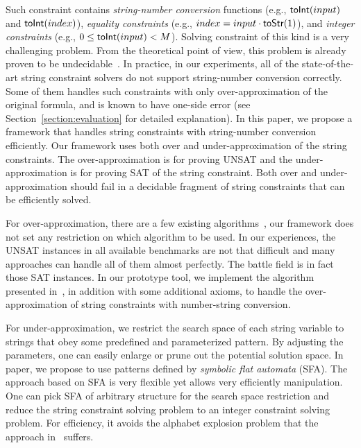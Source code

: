 \documentclass[sigplan,review,anonymous]{acmart}\settopmatter{printfolios=true,printccs=false,printacmref=false}
\begin{document}
Such constraint contains \textit{string-number conversion} functions (e.g., $\mbox{\textsf{toInt}($input$)}$ and $\mbox{\textsf{toInt}($index$)}$), \textit{equality constraints} (e.g., $index = input\cdot \mbox{\textsf{toStr}($1$)}$), and \textit{integer constraints} (e.g., $0 \leq \mbox{\textsf{toInt}($input$)}<M$). Solving constraint of this kind is a very challenging problem. From the theoretical point of view, this problem is already proven to be undecidable~\cite{day2018satisfiability}. In practice, in our experiments, all of the state-of-the-art string constraint solvers do not support string-number conversion correctly. Some of them handles such constraints with only over-approximation of the original formula, and is known to have one-side error (see Section~\ref{section:evaluation} for detailed explanation). 
In this paper, we propose a framework that handles string constraints with string-number conversion efficiently. Our framework uses both over and under-approximation of the string constraints. The over-approximation is for proving UNSAT and the under-approximation is for proving SAT of the string constraint. Both over and under-approximation should fail in a decidable fragment of string constraints that can be efficiently solved. 

For over-approximation, there are a few existing algorithms~\cite{parosh2019chain,z3}, our framework does not set any restriction on which algorithm to be used. In our experiences, the UNSAT instances in all available benchmarks are not that difficult and many approaches can handle all of them almost perfectly. The battle field is in fact those SAT instances. 
In our prototype tool, we implement the algorithm presented in~\cite{parosh2019chain}, in addition with some additional axioms, to handle the over-approximation of string constraints with number-string conversion. 

For under-approximation, we restrict the search space of each string variable to strings that obey some predefined and parameterized pattern. By adjusting the parameters, one can easily enlarge or prune out the potential solution space. In paper, we propose to use patterns defined by \emph{symbolic flat automata} (SFA). The approach based on SFA is very flexible yet allows very efficiently manipulation. One can pick SFA of arbitrary structure for the search space restriction and reduce the string constraint solving problem to an integer constraint solving problem. For efficiency, it avoids the alphabet 
explosion problem that the approach in~\cite{abdulla2017flatten} suffers.
\end{document}

